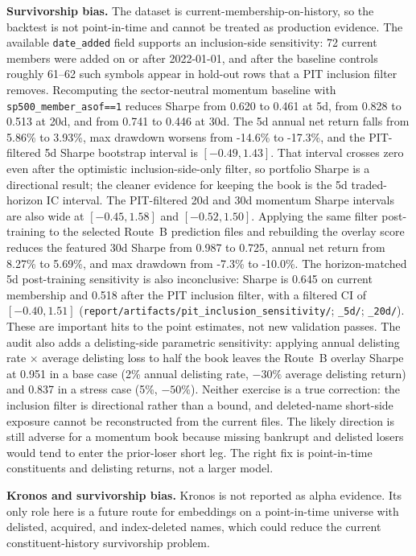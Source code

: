 \documentclass[9pt]{extarticle}
\begin{document}
\textbf{Survivorship bias.} The dataset is current-membership-on-history, so
the backtest is not point-in-time and cannot be treated as production evidence.
The available \texttt{date\_added} field supports an inclusion-side sensitivity:
72 current members were added on or after 2022-01-01, and after the baseline
controls roughly 61--62 such symbols appear in hold-out rows that a PIT
inclusion filter removes. Recomputing the sector-neutral momentum baseline with
\texttt{sp500\_member\_asof==1} reduces Sharpe from 0.620 to 0.461 at 5d, from
0.828 to 0.513 at 20d, and from 0.741 to 0.446 at 30d. The 5d annual net return
falls from 5.86\% to 3.93\%, max drawdown worsens from -14.6\% to -17.3\%, and
the PIT-filtered 5d Sharpe bootstrap interval is $[-0.49,1.43]$. That interval
crosses zero even after the optimistic inclusion-side-only filter, so portfolio
Sharpe is a directional result; the cleaner evidence for keeping the book is
the 5d traded-horizon IC interval. The PIT-filtered 20d and 30d momentum Sharpe
intervals are also wide at $[-0.45,1.58]$ and $[-0.52,1.50]$. Applying the same
filter post-training to the selected Route~B prediction files and rebuilding
the overlay score reduces the featured 30d Sharpe from 0.987 to 0.725, annual
net return from 8.27\% to 5.69\%, and max drawdown from -7.3\% to -10.0\%. The
horizon-matched 5d post-training sensitivity is also inconclusive: Sharpe is
0.645 on current membership and 0.518 after the PIT inclusion filter, with a
filtered CI of $[-0.40,1.51]$ (\texttt{report/artifacts/pit\_inclusion\_sensitivity/};
\texttt{\_5d/}; \texttt{\_20d/}). These are important hits to the point
estimates, not new validation passes. The audit also adds a delisting-side
parametric sensitivity: applying annual delisting rate $\times$ average
delisting loss to half the book leaves the Route~B overlay Sharpe at 0.951 in a
base case (2\% annual delisting rate, $-30\%$ average delisting return) and
0.837 in a stress case (5\%, $-50\%$). Neither exercise is a true correction:
the inclusion filter is directional rather than a bound, and deleted-name
short-side exposure cannot be reconstructed from the current files. The likely
direction is still adverse for a momentum book because missing bankrupt and
delisted losers would tend to enter the prior-loser short leg. The right fix is
point-in-time constituents and delisting returns, not a larger model.

\textbf{Kronos and survivorship bias.} Kronos is not reported as alpha evidence.
Its only role here is a future route for embeddings on a point-in-time universe
with delisted, acquired, and index-deleted names, which could reduce the current
constituent-history survivorship problem.
\end{document}
